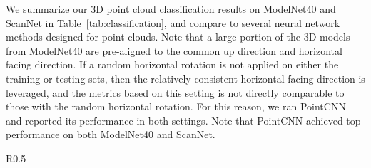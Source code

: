 \documentclass{article}
\begin{document}
We summarize our 3D point cloud classification results on ModelNet40 and ScanNet in Table~\ref{tab:classification}, and compare to several neural network methods designed for point clouds. Note that a large portion of the 3D models from ModelNet40 are pre-aligned to the common up direction and horizontal facing direction. If a random horizontal rotation is not applied on either the training or testing sets, then the relatively consistent horizontal facing direction is leveraged, and the metrics based on this setting is not directly comparable to those with the random horizontal rotation. For this reason, we ran PointCNN and reported its performance in both settings. Note that PointCNN achieved top performance on both ModelNet40 and ScanNet.



\begin{wraptable}{R}{0.5\linewidth}
\end{wraptable}
\end{document}
